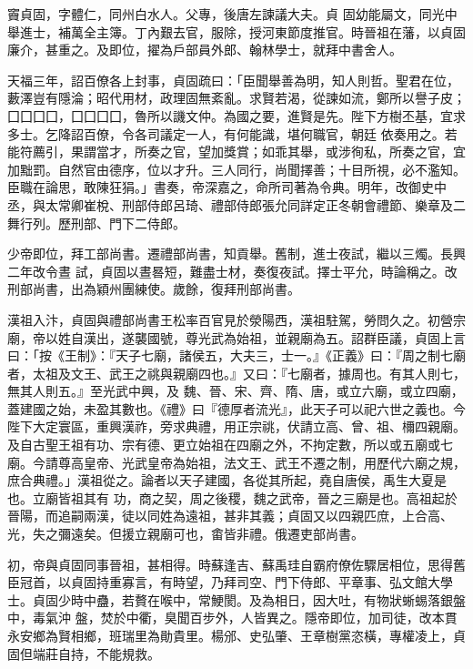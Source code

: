 \begin{pinyinscope}
 竇貞固，字體仁，同州白水人。父專，後唐左諫議大夫。貞
 固幼能屬文，同光中舉進士，補萬全主簿。丁內艱去官，服除，授河東節度推官。時晉祖在藩，以貞固廉介，甚重之。及即位，擢為戶部員外郎、翰林學士，就拜中書舍人。



 天福三年，詔百僚各上封事，貞固疏曰：「臣聞舉善為明，知人則哲。聖君在位，藪澤豈有隱淪；昭代用材，政理固無紊亂。求賢若渴，從諫如流，鄭所以譽子皮；囗囗囗囗，囗囗囗囗，魯所以譏文仲。為國之要，進賢是先。陛下方樹丕基，宜求多士。乞降詔百僚，令各司議定一人，有何能識，堪何職官，朝廷
 依奏用之。若能符薦引，果謂當才，所奏之官，望加獎賞；如乖其舉，或涉徇私，所奏之官，宜加黜罰。自然官由德序，位以才升。三人同行，尚聞擇善；十目所視，必不濫知。臣職在論思，敢陳狂狷。」書奏，帝深嘉之，命所司著為令典。明年，改御史中丞，與太常卿崔梲、刑部侍郎呂琦、禮部侍郎張允同詳定正冬朝會禮節、樂章及二舞行列。歷刑部、門下二侍郎。



 少帝即位，拜工部尚書。遷禮部尚書，知貢舉。舊制，進士夜試，繼以三燭。長興二年改令晝
 試，貞固以晝晷短，難盡士材，奏復夜試。擇士平允，時論稱之。改刑部尚書，出為穎州團練使。歲餘，復拜刑部尚書。



 漢祖入汴，貞固與禮部尚書王松率百官見於滎陽西，漢祖駐駕，勞問久之。初營宗廟，帝以姓自漢出，遂襲國號，尊光武為始祖，並親廟為五。詔群臣議，貞固上言曰：「按《王制》：『天子七廟，諸侯五，大夫三，士一。』《正義》曰：『周之制七廟者，太祖及文王、武王之祧與親廟四也。』又曰：『七廟者，據周也。有其人則七，無其人則五。』至光武中興，及
 魏、晉、宋、齊、隋、唐，或立六廟，或立四廟，蓋建國之始，未盈其數也。《禮》曰『德厚者流光』，此天子可以祀六世之義也。今陛下大定寰區，重興漢祚，旁求典禮，用正宗祧，伏請立高、曾、祖、檷四親廟。及自古聖王祖有功、宗有德、更立始祖在四廟之外，不拘定數，所以或五廟或七廟。今請尊高皇帝、光武皇帝為始祖，法文王、武王不遷之制，用歷代六廟之規，庶合典禮。」漢祖從之。論者以天子建國，各從其所起，堯自唐侯，禹生大夏是也。立廟皆祖其有
 功，商之契，周之後稷，魏之武帝，晉之三廟是也。高祖起於晉陽，而追嗣兩漢，徒以同姓為遠祖，甚非其義；貞固又以四親匹庶，上合高、光，失之彌遠矣。但援立親廟可也，畬皆非禮。俄遷吏部尚書。



 初，帝與貞固同事晉祖，甚相得。時蘇逢吉、蘇禹珪自霸府僚佐驟居相位，思得舊臣冠首，以貞固持重寡言，有時望，乃拜司空、門下侍郎、平章事、弘文館大學士。貞固少時中蠱，若贅在喉中，常鯁閡。及為相日，因大吐，有物狀蜥蜴落銀盤中，毒氣沖
 盤，焚於中衢，臭聞百步外，人皆異之。隱帝即位，加司徒，改本貫永安鄉為賢相鄉，班瑞里為勛貴里。楊邠、史弘肇、王章樹黨恣橫，專權凌上，貞固但端莊自持，不能規救。




\end{pinyinscope}
